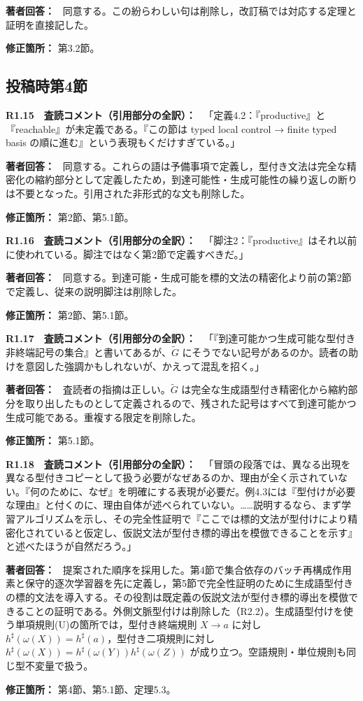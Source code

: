 \documentclass[10pt,a4paper]{ltjsarticle}
\newcommand{\Comment}[1]{\par\medskip\noindent\textbf{#1　査読コメント（引用部分の全訳）：}\ }
\newcommand{\Reply}{\par\noindent\textbf{著者回答：}\ }
\newcommand{\Location}[1]{\par\noindent\textbf{修正箇所：} #1\par}
\begin{document}
\Reply
同意する。この紛らわしい句は削除し，改訂稿では対応する定理と証明を直接記した。
\Location{第3.2節。}




\subsection*{投稿時第4節}
\Comment{R1.15}
「定義4.2：『productive』と『reachable』が未定義である。『この節は typed local control → finite typed basis の順に進む』という表現もくだけすぎている。」

\Reply
同意する。これらの語は予備事項で定義し，型付き文法は完全な精密化の縮約部分として定義したため，到達可能性・生成可能性の繰り返しの断りは不要となった。引用された非形式的な文も削除した。
\Location{第2節、第5.1節。}

\Comment{R1.16}
「脚注2：『productive』はそれ以前に使われている。脚注ではなく第2節で定義すべきだ。」

\Reply
同意する。到達可能・生成可能を標的文法の精密化より前の第2節で定義し、従来の説明脚注は削除した。
\Location{第2節、第5.1節。}

\Comment{R1.17}
「『到達可能かつ生成可能な型付き非終端記号の集合』と書いてあるが、$\widetilde G$ にそうでない記号があるのか。読者の助けを意図した強調かもしれないが、かえって混乱を招く。」

\Reply
査読者の指摘は正しい。$\widetilde G$ は完全な生成語型付き精密化から縮約部分を取り出したものとして定義されるので、残された記号はすべて到達可能かつ生成可能である。重複する限定を削除した。
\Location{第5.1節。}

\Comment{R1.18}
「冒頭の段落では、異なる出現を異なる型付きコピーとして扱う必要がなぜあるのか、理由が全く示されていない。『何のために、なぜ』を明確にする表現が必要だ。例4.3には『型付けが必要な理由』と付くのに、理由自体が述べられていない。……説明するなら、まず学習アルゴリズムを示し、その完全性証明で『ここでは標的文法が型付けにより精密化されていると仮定し、仮説文法が型付き標的導出を模倣できることを示す』と述べたほうが自然だろう。」

\Reply
提案された順序を採用した。第4節で集合依存のバッチ再構成作用素と保守的逐次学習器を先に定義し，第5節で完全性証明のために生成語型付きの標的文法を導入する。その役割は既定義の仮説文法が型付き標的導出を模倣できることの証明である。外側文脈型付けは削除した（R2.2）。生成語型付けを使う単項規則(U)の箇所では，型付き終端規則 $X\to a$ に対し $h^\sharp(\omega(X))=h^\sharp(a)$，型付き二項規則に対し $h^\sharp(\omega(X))=h^\sharp(\omega(Y))h^\sharp(\omega(Z))$ が成り立つ。空語規則・単位規則も同じ型不変量で扱う。
\Location{第4節、第5.1節、定理5.3。}
\end{document}
